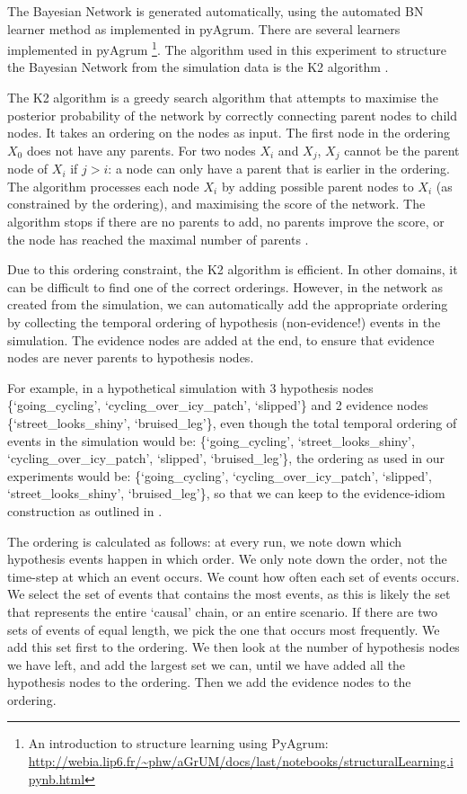 The Bayesian Network is generated automatically, using the automated BN learner method as implemented in pyAgrum. There are several learners implemented in pyAgrum \footnote{An introduction to structure learning using PyAgrum: \url{http://webia.lip6.fr/~phw/aGrUM/docs/last/notebooks/structuralLearning.ipynb.html}}. The algorithm used in this experiment to structure the Bayesian Network from the simulation data is the K2 algorithm \citep{Cooper1992}. 

The K2 algorithm is a greedy search algorithm that attempts to maximise the posterior probability of the network by correctly connecting parent nodes to child nodes. It takes an ordering on the nodes as input. The first node in the ordering $X_0$ does not have any parents. For two nodes $X_i$ and $X_j$, $X_j$ cannot be the parent node of $X_i$ if $j > i$: a node can only have a parent that is earlier in the ordering. The algorithm processes each node $X_i$ by adding possible parent nodes to $X_i$ (as constrained by the ordering), and maximising the score of the network. The algorithm stops if there are no parents to add, no parents improve the score, or the node has reached the maximal number of parents \citep{Chen2008}.

Due to this ordering constraint, the K2 algorithm is efficient. In other domains, it can be difficult to find one of the correct orderings. However, in the network as created from the simulation, we can automatically add the appropriate ordering by collecting the temporal ordering of hypothesis (non-evidence!) events in the simulation. The evidence nodes are added at the end, to ensure that evidence nodes are never parents to hypothesis nodes. 

For example, in a hypothetical simulation with 3 hypothesis nodes \{`going\_cycling', `cycling\_over\_icy\_patch', `slipped'\} and 2 evidence nodes \{`street\_looks\_shiny', `bruised\_leg'\}, even though the total temporal ordering of events in the simulation would be:  \{`going\_cycling', `street\_looks\_shiny', `cycling\_over\_icy\_patch', `slipped', `bruised\_leg'\}, the ordering as used in our experiments would be: \{`going\_cycling', `cycling\_over\_icy\_patch', `slipped', `street\_looks\_shiny', `bruised\_leg'\}, so that we can keep to the evidence-idiom construction as outlined in \citet{Fenton2012}. 

The ordering is calculated as follows: at every run, we note down which hypothesis events happen in which order. We only note down the order, not the time-step at which an event occurs. We count how often each set of events occurs. We select the set of events that contains the most events, as this is likely the set that represents the entire `causal' chain, or an entire scenario. If there are two sets of events of equal length, we pick the one that occurs most frequently. We add this set first to the ordering. We then look at the number of hypothesis nodes we have left, and add the largest set we can, until we have added all the hypothesis nodes to the ordering. Then we add the evidence nodes to the ordering.

